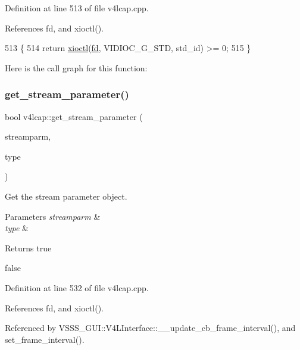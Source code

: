 Definition at line 513 of file v4lcap.\+cpp.



References fd, and xioctl().


\begin{DoxyCode}
513                                                  \{
514     \textcolor{keywordflow}{return} \hyperlink{classv4lcap_ab5aaa5a8c0df17f5ca57e0b5170232cb}{xioctl}(\hyperlink{classv4lcap_a38109593bde997dad13b3a461569573d}{fd}, VIDIOC\_G\_STD, std\_id) >= 0;
515 \}
\end{DoxyCode}
Here is the call graph for this function\+:
\mbox{\label{classv4lcap_a067a6b97d6c4d3ea83454132f1d3c87e}} 
\subsubsection{\texorpdfstring{get\+\_\+stream\+\_\+parameter()}{get\_stream\_parameter()}}
{\footnotesize\ttfamily bool v4lcap\+::get\+\_\+stream\+\_\+parameter (\begin{DoxyParamCaption}\item[{struct v4l2\+\_\+streamparm $\ast$}]{streamparm,  }\item[{unsigned int}]{type }\end{DoxyParamCaption})}



Get the stream parameter object. 


\begin{DoxyParams}{Parameters}
{\em streamparm} & \\
\hline
{\em type} & \\
\hline
\end{DoxyParams}
\begin{DoxyReturn}{Returns}
true 

false 
\end{DoxyReturn}


Definition at line 532 of file v4lcap.\+cpp.



References fd, and xioctl().



Referenced by V\+S\+S\+S\+\_\+\+G\+U\+I\+::\+V4\+L\+Interface\+::\+\_\+\+\_\+update\+\_\+cb\+\_\+frame\+\_\+interval(), and set\+\_\+frame\+\_\+interval().


